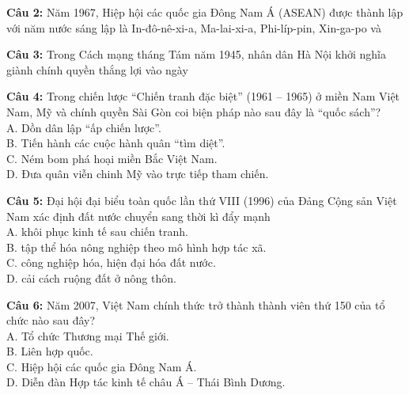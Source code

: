 \documentclass[12pt,a4paper]{article}
\begin{document}
\noindent \textbf{Câu 2:} Năm 1967, Hiệp hội các quốc gia Đông Nam Á (ASEAN) được thành lập với năm nước sáng lập là In-đô-nê-xi-a, Ma-lai-xi-a, Phi-líp-pin, Xin-ga-po và\\
\noindent{}

\noindent \textbf{Câu 3:} Trong Cách mạng tháng Tám năm 1945, nhân dân Hà Nội khởi nghĩa giành chính quyền thắng lợi vào ngày\\
\noindent{}

\noindent \textbf{Câu 4:} Trong chiến lược ``Chiến tranh đặc biệt'' (1961 -- 1965) ở miền Nam Việt Nam, Mỹ và chính quyền Sài Gòn coi biện pháp nào sau đây là ``quốc sách''?\\
\noindent A. Dồn dân lập ``ấp chiến lược''.\\
\noindent B. Tiến hành các cuộc hành quân ``tìm diệt''.\\
\noindent C. Ném bom phá hoại miền Bắc Việt Nam.\\
\noindent D. Đưa quân viễn chinh Mỹ vào trực tiếp tham chiến.

\noindent \textbf{Câu 5:} Đại hội đại biểu toàn quốc lần thứ VIII (1996) của Đảng Cộng sản Việt Nam xác định đất nước chuyển sang thời kì đẩy mạnh\\
\noindent A. khôi phục kinh tế sau chiến tranh.\\
\noindent B. tập thể hóa nông nghiệp theo mô hình hợp tác xã.\\
\noindent C. công nghiệp hóa, hiện đại hóa đất nước.\\
\noindent D. cải cách ruộng đất ở nông thôn.

\noindent \textbf{Câu 6:} Năm 2007, Việt Nam chính thức trở thành thành viên thứ 150 của tổ chức nào sau đây?\\
\noindent A. Tổ chức Thương mại Thế giới.\\
\noindent B. Liên hợp quốc.\\
\noindent C. Hiệp hội các quốc gia Đông Nam Á.\\
\noindent D. Diễn đàn Hợp tác kinh tế châu Á -- Thái Bình Dương.
\end{document}
